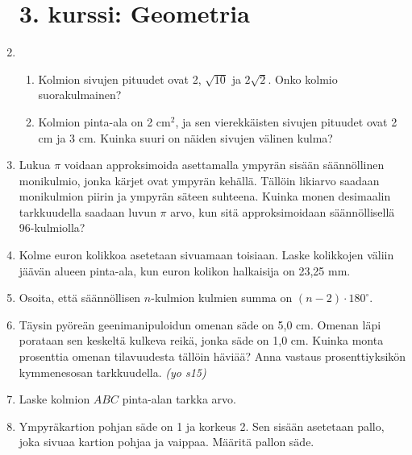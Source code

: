 \documentclass[12pt,fleqn]{article}
\begin{document}
\begin{enumerate}[label=\textbf{\arabic*.}]
\section*{3. kurssi: Geometria}

\item 
\begin{enumerate}[label=\textbf{\alph*)}]
\item Kolmion sivujen pituudet ovat 2, \(\sqrt{10}\) ja \(2\sqrt{2}\). Onko kolmio suorakulmainen?
\item Kolmion pinta-ala on 2 cm\(^2\), ja sen vierekkäisten sivujen pituudet ovat 2 cm ja 3 cm. Kuinka suuri on näiden sivujen välinen kulma?
\end{enumerate}

\item Lukua \(\pi\) voidaan approksimoida asettamalla ympyrän sisään säännöllinen monikulmio, jonka kärjet ovat ympyrän kehällä. Tällöin likiarvo saadaan monikulmion piirin ja ympyrän säteen suhteena. Kuinka monen desimaalin tarkkuudella saadaan luvun \(\pi\) arvo, kun sitä approksimoidaan säännöllisellä 96-kulmiolla?

\item Kolme euron kolikkoa asetetaan sivuamaan toisiaan. Laske kolikkojen väliin jäävän alueen pinta-ala, kun euron kolikon halkaisija on 23,25 mm.

\item Osoita, että säännöllisen \(n\)-kulmion kulmien summa on \((n-2)\cdot 180^{\circ}\).


\item Täysin pyöreän geenimanipuloidun omenan säde on 5,0 cm. Omenan läpi porataan sen keskeltä kulkeva reikä, jonka säde on 1,0 cm. Kuinka monta prosenttia omenan tilavuudesta tällöin häviää? Anna vastaus prosenttiyksikön kymmenesosan tarkkuudella. \emph{(yo s15)}

\item Laske kolmion \(ABC\) pinta-alan tarkka arvo.


\item Ympyräkartion pohjan säde on 1 ja korkeus 2. Sen sisään asetetaan pallo, joka sivuaa kartion pohjaa ja vaippaa. Määritä pallon säde.

\begin{tikzpicture}


\end{tikzpicture}
\end{enumerate}
\end{document}
